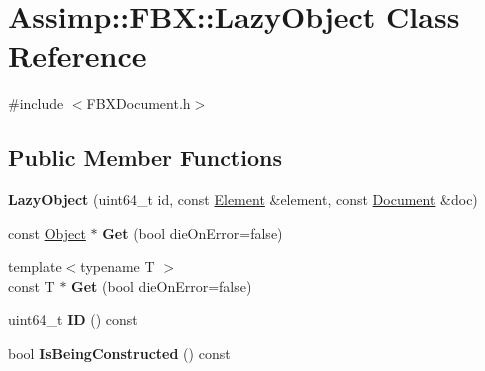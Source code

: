 \hypertarget{class_assimp_1_1_f_b_x_1_1_lazy_object}{\section{Assimp\+:\+:F\+B\+X\+:\+:Lazy\+Object Class Reference}
\label{class_assimp_1_1_f_b_x_1_1_lazy_object}
}


{\ttfamily \#include $<$F\+B\+X\+Document.\+h$>$}

\subsection*{Public Member Functions}
\begin{DoxyCompactItemize}
\item 
\hypertarget{class_assimp_1_1_f_b_x_1_1_lazy_object_aa0b7ba3714003bd93de916e26e7d4468}{{\bfseries Lazy\+Object} (uint64\+\_\+t id, const \hyperlink{class_assimp_1_1_f_b_x_1_1_element}{Element} \&element, const \hyperlink{class_assimp_1_1_f_b_x_1_1_document}{Document} \&doc)}\label{class_assimp_1_1_f_b_x_1_1_lazy_object_aa0b7ba3714003bd93de916e26e7d4468}

\item 
\hypertarget{class_assimp_1_1_f_b_x_1_1_lazy_object_a5b8c9872aaa85003c72710d87b75406e}{const \hyperlink{class_assimp_1_1_f_b_x_1_1_object}{Object} $\ast$ {\bfseries Get} (bool die\+On\+Error=false)}\label{class_assimp_1_1_f_b_x_1_1_lazy_object_a5b8c9872aaa85003c72710d87b75406e}

\item 
\hypertarget{class_assimp_1_1_f_b_x_1_1_lazy_object_aa6d1c0d82547f799d8a23f259f3fcae6}{{\footnotesize template$<$typename T $>$ }\\const T $\ast$ {\bfseries Get} (bool die\+On\+Error=false)}\label{class_assimp_1_1_f_b_x_1_1_lazy_object_aa6d1c0d82547f799d8a23f259f3fcae6}

\item 
\hypertarget{class_assimp_1_1_f_b_x_1_1_lazy_object_a9cb5475d18569dd2f59f4e27412c8248}{uint64\+\_\+t {\bfseries I\+D} () const }\label{class_assimp_1_1_f_b_x_1_1_lazy_object_a9cb5475d18569dd2f59f4e27412c8248}

\item 
\hypertarget{class_assimp_1_1_f_b_x_1_1_lazy_object_a18d8b981625bab9307a3a78a9f8fe722}{bool {\bfseries Is\+Being\+Constructed} () const }\label{class_assimp_1_1_f_b_x_1_1_lazy_object_a18d8b981625bab9307a3a78a9f8fe722}


\end{DoxyCompactItemize}
